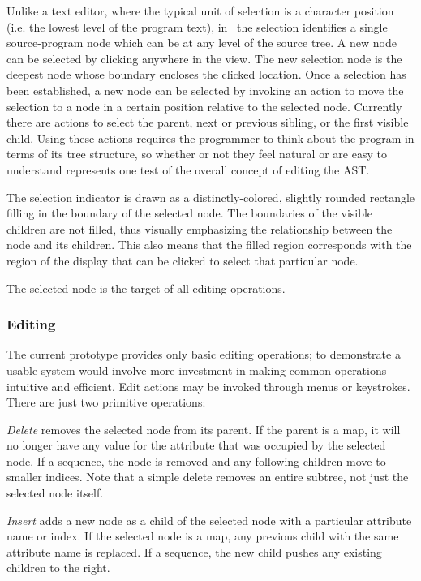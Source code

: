 Unlike a text editor, where the typical unit of selection is a character position (i.e. the lowest level of the program text), in \Meta\ the selection identifies a single source-program node which can be at any level of the source tree. A new node can be selected by clicking anywhere in the view. The new selection node is the deepest node whose boundary encloses the clicked location. Once a selection has been established, a new node can be selected by invoking an action to move the selection to a node in a certain position relative to the selected node. Currently there are actions to select the parent, next or previous sibling, or the first visible child. Using these actions requires the programmer to think about the program in terms of its tree structure, so whether or not they feel natural or are easy to understand represents one test of the overall concept of editing the AST.

The selection indicator is drawn as a distinctly-colored, slightly rounded rectangle filling in the boundary of the selected node. The boundaries of the visible children are not filled, thus visually emphasizing the relationship between the node and its children. This also means that the filled region corresponds with the region of the display that can be clicked to select that particular node. 

The selected node is the target of all editing operations.


\subsubsection{Editing}
The current prototype provides only basic editing operations; to demonstrate a usable system would involve more investment in making common operations intuitive and efficient. Edit actions may be invoked through menus or keystrokes. There are just two primitive operations:

\emph{Delete} removes the selected node from its parent. If the parent is a map, it will no longer have any value for the attribute that was occupied by the selected node. If a sequence, the node is removed and any following children move to smaller indices. Note that a simple delete removes an entire subtree, not just the selected node itself.

\emph{Insert} adds a new node as a child of the selected node with a particular attribute name or index. If the selected node is a map, any previous child with the same attribute name is replaced. If a sequence, the new child pushes any existing children to the right.

